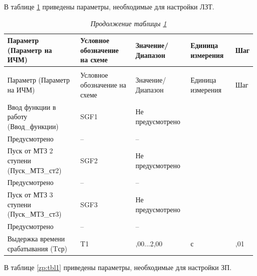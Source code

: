 В таблице \ref{lzt:tbl1} приведены параметры, необходимые для настройки ЛЗТ.

\footnotesize
\begin{longtable}{|>{\centering\arraybackslash}m{5.3cm}|>{\centering\arraybackslash}m{3.3cm}|>{\centering\arraybackslash}m{4.2cm}|>{\centering\arraybackslash}m{1.8cm}|>{\centering\arraybackslash}m{1cm}|}
\caption{Параметры для настройки ЛЗТ\hfill\vspace{-0.5\baselineskip}}\label{lzt:tbl1}\\ 
\hline
\rowcolor{unimain!40}
Параметр (Параметр на ИЧМ) & Условное обозначение на схеме & Значение/ Диапазон & Единица измерения & Шаг \\ 
\hline
\endfirsthead
\caption*{\hspace{3pt}\emph{Продолжение таблицы \ref{lzt:tbl1}\hfill\vspace{-0.5\baselineskip}}} \\ %
\hline
\rowcolor{unimain!40}
Параметр (Параметр на ИЧМ) & Условное обозначение на схеме & Значение/ Диапазон & Единица измерения & Шаг \\ 
\endhead
\endfoot
\endlastfoot
\centering Ввод функции в работу (Ввод\_функции)  & \centering SGF1 & \centering Не предусмотрено \\ Предусмотрено & \centering -- & \centering \arraybackslash -- \\
\hline
\centering Пуск от МТЗ 2 ступени (Пуск\_МТЗ\_ст2)  & \centering SGF2 & \centering Не предусмотрено \\ Предусмотрено & \centering -- & \centering \arraybackslash -- \\
\hline
\centering Пуск от МТЗ 3 ступени (Пуск\_МТЗ\_ст3)  & \centering SGF3 & \centering Не предусмотрено \\ Предусмотрено & \centering -- & \centering \arraybackslash -- \\
\hline
\centering Выдержка времени срабатывания (Tср)  & \centering T1 & \centering 0,00...2,00 & \centering с & \centering \arraybackslash 0,01 \\
\hline
\end{longtable}
\normalsize


\par
В таблице \ref{zp:tbl1} приведены параметры, необходимые для настройки ЗП.

